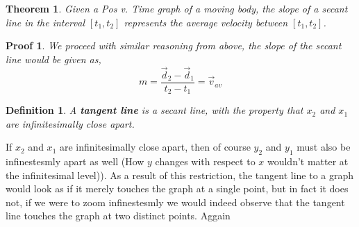\documentclass[12pt]{article}
\theoremstyle{break}
\newtheorem{thm}{Theorem}[subsection]
\newtheorem*{pf}{Proof}
\newtheorem{defn}{Definition}[subsection]
\begin{document}
\begin{thm}
Given a Pos v. Time graph of a moving body, the slope of a secant line in the interval $[t_1,t_2]$ represents the average velocity between $[t_1,t_2]$.
\end{thm}
\begin{pf}
	We proceed with similar reasoning from above, the slope of the secant line would be given as,
	$$m = \frac{\vec d_2 - \vec d_1}{t_2 - t_1} = \vec v_{av}$$
\end{pf}
\begin{defn}
A \textbf{tangent line} is a secant line, with the property that $x_2$ and $x_1$ are infinitesimally close apart.
\end{defn}
If $x_2$ and $x_1$ are infinitesimally close apart, then of course $y_2$ and $y_1$ must also be infinestesmly apart as well (How $y$ changes with respect to $x$ wouldn't matter at the infinitesimal level)). As a result of this restriction, the tangent line to a graph would look as if it merely touches the graph at a single point, but in fact it does not, if we were to zoom infinestesmly we would indeed observe that the tangent line touches the graph at two distinct points. Aggain

	




	
\end{document}
